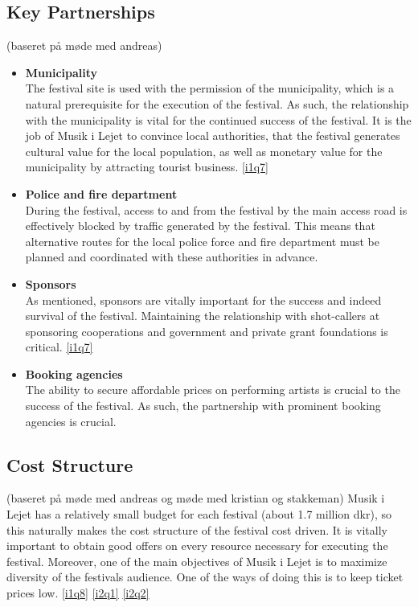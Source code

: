 \subsection{Key Partnerships} %
\label{sub:key_partnerships}
(baseret på møde med andreas)
\begin{itemize}
	\item \textbf{Municipality}\\
	The festival site is used with the permission of the municipality, which is a natural prerequisite for the execution of the festival. As such, the relationship with the municipality is vital for the continued success of the festival. It is the job of Musik i Lejet to convince local authorities, that the festival generates cultural value for the local population, as well as monetary value for the municipality  by attracting tourist business. \ref{i1q7}
	\item \textbf{Police and fire department}\\
	During the festival, access to and from the festival by the main access road is effectively blocked by traffic generated by the festival. This means that alternative routes for the local police force and fire department must be planned and coordinated with these authorities in advance. \
	\item \textbf{Sponsors}\\
	As mentioned, sponsors are vitally important for the success and indeed survival of the festival. Maintaining the relationship with shot-callers at sponsoring cooperations and government and private grant foundations is critical. \ref{i1q7}
	\item \textbf{Booking agencies}\\
	The ability to secure affordable prices on performing artists is crucial to the success of the festival. As such, the partnership with prominent booking agencies is crucial.
\end{itemize}

\subsection{Cost Structure} %
\label{sub:cost_structure}
(baseret på møde med andreas og møde med kristian og stakkeman)
Musik i Lejet has a relatively small budget for each festival (about 1.7 million dkr), so this naturally makes the cost structure of the festival cost driven. It is vitally important to obtain good offers on every resource necessary for executing the festival. Moreover, one of the main objectives of Musik i Lejet is to maximize diversity of the festivals audience. One of the ways of doing this is to keep ticket prices low. \ref{i1q8} \ref{i2q1} \ref{i2q2}